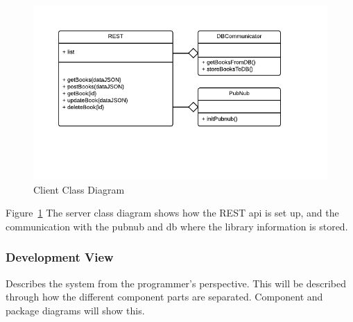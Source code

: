 \begin{figure}
\centering
\includegraphics[width=6in]{image/ServerClassDiagram.png}
\caption{Client Class Diagram}
\label{figure:serverClassDiagram}
\end{figure}

Figure~\ref{figure:serverClassDiagram} The server class diagram shows how the REST api is set up, and the communication with the pubnub and db where the library information is stored.


\subsubsection{Development View}
Describes the system from the programmer's perspective. This will be described through how the different component parts are separated. Component and package diagrams will show this.

